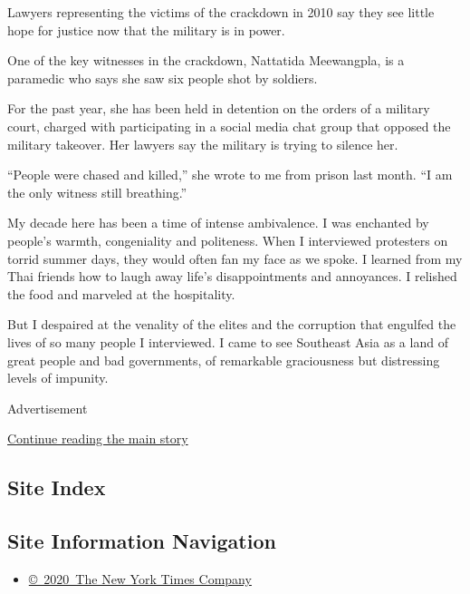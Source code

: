 Lawyers representing the victims of the crackdown in 2010 say they see
little hope for justice now that the military is in power.

One of the key witnesses in the crackdown, Nattatida Meewangpla, is a
paramedic who says she saw six people shot by soldiers.

For the past year, she has been held in detention on the orders of a
military court, charged with participating in a social media chat group
that opposed the military takeover. Her lawyers say the military is
trying to silence her.

``People were chased and killed,'' she wrote to me from prison last
month. ``I am the only witness still breathing.''

My decade here has been a time of intense ambivalence. I was enchanted
by people's warmth, congeniality and politeness. When I interviewed
protesters on torrid summer days, they would often fan my face as we
spoke. I learned from my Thai friends how to laugh away life's
disappointments and annoyances. I relished the food and marveled at the
hospitality.

But I despaired at the venality of the elites and the corruption that
engulfed the lives of so many people I interviewed. I came to see
Southeast Asia as a land of great people and bad governments, of
remarkable graciousness but distressing levels of impunity.

Advertisement

\protect\hyperlink{after-bottom}{Continue reading the main story}

\hypertarget{site-index}{%
\subsection{Site Index}\label{site-index}}

\hypertarget{site-information-navigation}{%
\subsection{Site Information
Navigation}\label{site-information-navigation}}

\begin{itemize}
\tightlist
\item
  \href{https://help.nytimes.com/hc/en-us/articles/115014792127-Copyright-notice}{©~2020~The
  New York Times Company}
\end{itemize}

